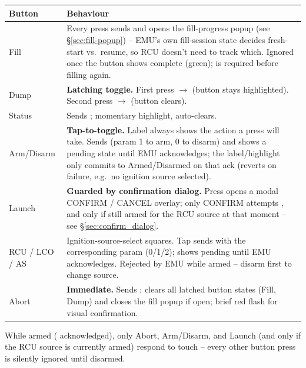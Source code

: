 ﻿\documentclass[11pt,letterpaper]{article}
\begin{document}
\begin{sloppypar}
\begin{center}
\begin{tabularx}{\textwidth}{@{}lY@{}}
\toprule
Button & Behaviour \\
\midrule
Fill & Every press sends  and opens the fill-progress popup
       (see §\ref{sec:fill-popup}) -- EMU's own fill-session state decides
       fresh-start vs.\ resume, so RCU doesn't need to track which. Ignored
       once the button shows complete (green);  is required
       before filling again. \\
Dump & \textbf{Latching toggle.} First press $\to$  (button stays
       highlighted). Second press $\to$  (button clears). \\
Status & Sends ; momentary highlight, auto-clears. \\
Arm/Disarm & \textbf{Tap-to-toggle.} Label always shows the action a press
       will take. Sends  (param 1 to arm, 0 to disarm) and
       shows a pending state until EMU acknowledges; the label/highlight
       only commits to Armed/Disarmed on that ack (reverts on failure,
       e.g.\ no ignition source selected). \\
Launch & \textbf{Guarded by confirmation dialog.} Press opens a modal
       CONFIRM / CANCEL overlay; only CONFIRM attempts ,
       and only if still armed for the RCU source at that moment -- see
       §\ref{sec:confirm_dialog}. \\
RCU / LCO / AS & Ignition-source-select squares. Tap sends
        with the corresponding param (0/1/2);
       shows pending until EMU acknowledges. Rejected by EMU while armed --
       disarm first to change source. \\
Abort & \textbf{Immediate.} Sends ; clears all latched button
       states (Fill, Dump) and closes the fill popup if open; brief red
       flash for visual confirmation. \\
\bottomrule
\end{tabularx}
\end{center}
\end{sloppypar}

\begin{notebox}
While armed ( acknowledged), only Abort, Arm/Disarm, and
Launch (and only if the RCU source is currently armed) respond to touch --
every other button press is silently ignored until disarmed.
\end{notebox}
\end{document}
